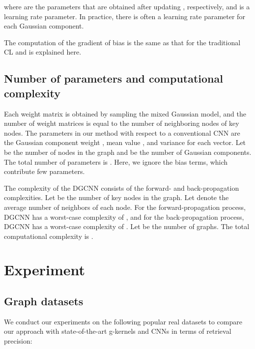 \documentclass[11pt]{article}
\begin{document}
where   are the parameters that are obtained after updating , respectively, and  is a learning rate parameter. In practice, there is often a learning rate parameter  for each Gaussian component.

The computation of the gradient of bias  is the same as that for the traditional CL and is explained here.


\subsection{Number of parameters and computational complexity}
Each weight matrix  is obtained by sampling the mixed Gaussian model, and the number of weight matrices is equal to the number of neighboring nodes of key nodes. The parameters in our method with respect to a conventional CNN are the Gaussian component weight , mean value , and variance  for each vector. Let  be the number of nodes in the graph and  be the number of Gaussian components. The total number of parameters is . Here, we ignore the bias terms, which contribute few parameters.

The complexity of the DGCNN consists of the forward- and back-propagation complexities. Let  be the number of key nodes in the graph. Let  denote the average number of neighbors of each node. For the forward-propagation process, DGCNN has a worst-case complexity of , and for the back-propagation process, DGCNN has a worst-case complexity of . Let  be the number of graphs. The total computational complexity is .

\section{Experiment}
\subsection{Graph datasets}

We conduct our experiments on the following popular real datasets to compare our approach with state-of-the-art g-kernels and CNNs in terms of retrieval precision:
\end{document}
